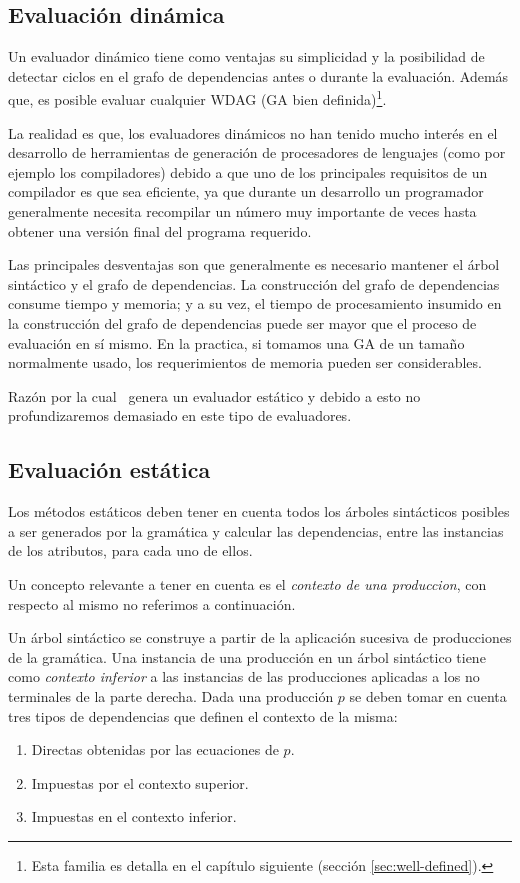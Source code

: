 \subsection{Evaluación dinámica}

Un evaluador dinámico tiene como ventajas su simplicidad y la posibilidad de detectar ciclos en el grafo de dependencias antes o durante la evaluación. Además que, es posible evaluar cualquier WDAG (GA bien definida)\footnote{Esta familia es detalla en el capítulo siguiente (sección \ref{sec:well-defined}).}.

La realidad es que, los evaluadores dinámicos no han tenido mucho interés en el desarrollo de herramientas de generación de procesadores de lenguajes (como por ejemplo los compiladores) debido a que uno de los principales requisitos de un compilador es que sea eficiente, ya que durante un desarrollo un programador generalmente necesita recompilar un número muy importante de veces hasta obtener una versión final del programa requerido.

Las principales desventajas son que generalmente es necesario mantener el árbol sintáctico y el grafo de dependencias. La construcción del grafo de dependencias consume tiempo y memoria; y a su vez, el tiempo de procesamiento insumido en la construcción del grafo de dependencias puede ser mayor que el proceso de evaluación en sí mismo. En la practica, si tomamos una GA de un tamaño normalmente usado, los requerimientos de memoria pueden ser considerables.  

Razón por la cual \maggen\ genera un evaluador estático y debido a esto no profundizaremos demasiado en este tipo de evaluadores.

\subsection{Evaluación estática}
\label{subsec:eval-est}
Los métodos estáticos deben tener en cuenta todos los árboles sintácticos posibles a ser generados por la gramática y calcular las dependencias, entre las instancias de los atributos, para cada uno de ellos. 

Un concepto relevante a tener en cuenta es el \textit{contexto de una produccion}, con respecto al mismo no referimos a continuación.

Un árbol sintáctico se construye a partir de la aplicación sucesiva de producciones de la
gramática. Una instancia de una producción en un árbol sintáctico tiene como
\emph{contexto inferior} a las instancias de las producciones aplicadas a los no terminales de la parte derecha.
Dada una producción $p$ se deben tomar en cuenta tres tipos de dependencias que definen el contexto de la misma:
\begin{enumerate}
\item Directas obtenidas por las ecuaciones de $p$.
\item Impuestas por el contexto superior.
\item Impuestas en el contexto inferior.
\end{enumerate}

